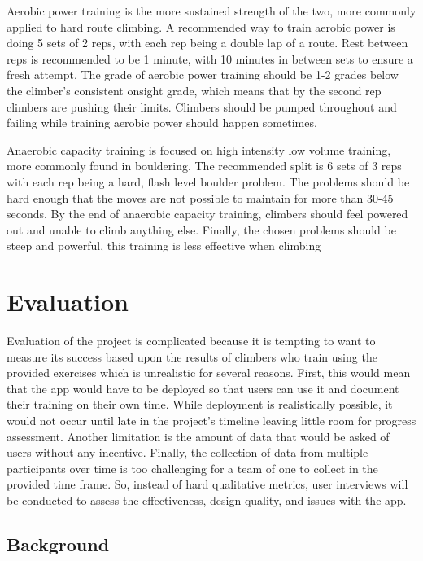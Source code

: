 \documentclass[10pt,twocolumn]{article}
\begin{document}
	Aerobic power training is the more sustained strength of the two, more commonly applied to hard route climbing. A recommended way to train aerobic power is doing 5 sets of 2 reps, with each rep being a double lap of a route. Rest between reps is recommended to be 1 minute, with 10 minutes in between sets to ensure a fresh attempt. The grade of aerobic power training should be 1-2 grades below the climber's consistent onsight grade, which means that by the second rep climbers are pushing their limits. Climbers should be pumped throughout and failing while training aerobic power should happen sometimes. 

	Anaerobic capacity training is focused on high intensity low volume training, more commonly found in bouldering. The recommended split is 6 sets of 3 reps with each rep being a hard, flash level boulder problem. The problems should be hard enough that the moves are not possible to maintain for more than 30-45 seconds. By the end of anaerobic capacity training, climbers should feel powered out and unable to climb anything else. Finally, the chosen problems should be steep and powerful, this training is less effective when climbing 

\section{Evaluation}

	Evaluation of the project is complicated because it is tempting to want to measure its success based upon the results of climbers who train using the provided exercises which is unrealistic for several reasons. First, this would mean that the app would have to be deployed so that users can use it and document their training on their own time. While deployment is realistically possible, it would not occur until late in the project’s timeline leaving little room for progress assessment. Another limitation is the amount of data that would be asked of users without any incentive. Finally, the collection of data from multiple participants over time is too challenging for a team of one to collect in the provided time frame. So, instead of hard qualitative metrics, user interviews will be conducted to assess the effectiveness, design quality, and issues with the app. 

\subsection{Background}
\end{document}
